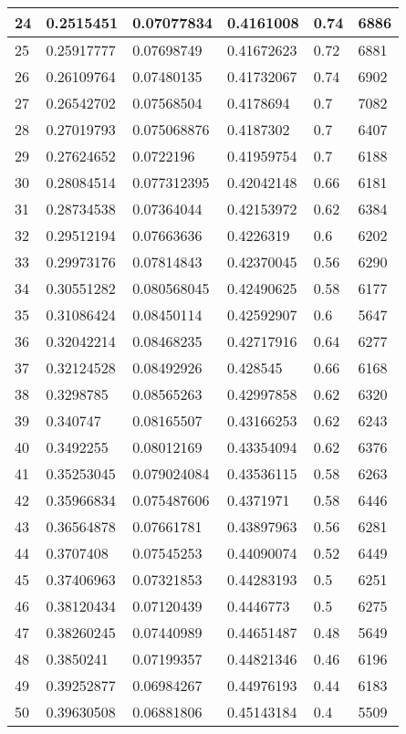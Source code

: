 \begin{longtable}{|l|l|l|l|l|l|}
24 & 0.2515451 & 0.07077834 & 0.4161008 & 0.74 & 6886 \\ \hline 
25 & 0.25917777 & 0.07698749 & 0.41672623 & 0.72 & 6881 \\ \hline 
26 & 0.26109764 & 0.07480135 & 0.41732067 & 0.74 & 6902 \\ \hline 
27 & 0.26542702 & 0.07568504 & 0.4178694 & 0.7 & 7082 \\ \hline 
28 & 0.27019793 & 0.075068876 & 0.4187302 & 0.7 & 6407 \\ \hline 
29 & 0.27624652 & 0.0722196 & 0.41959754 & 0.7 & 6188 \\ \hline 
30 & 0.28084514 & 0.077312395 & 0.42042148 & 0.66 & 6181 \\ \hline 
31 & 0.28734538 & 0.07364044 & 0.42153972 & 0.62 & 6384 \\ \hline 
32 & 0.29512194 & 0.07663636 & 0.4226319 & 0.6 & 6202 \\ \hline 
33 & 0.29973176 & 0.07814843 & 0.42370045 & 0.56 & 6290 \\ \hline 
34 & 0.30551282 & 0.080568045 & 0.42490625 & 0.58 & 6177 \\ \hline 
35 & 0.31086424 & 0.08450114 & 0.42592907 & 0.6 & 5647 \\ \hline 
36 & 0.32042214 & 0.08468235 & 0.42717916 & 0.64 & 6277 \\ \hline 
37 & 0.32124528 & 0.08492926 & 0.428545 & 0.66 & 6168 \\ \hline 
38 & 0.3298785 & 0.08565263 & 0.42997858 & 0.62 & 6320 \\ \hline 
39 & 0.340747 & 0.08165507 & 0.43166253 & 0.62 & 6243 \\ \hline 
40 & 0.3492255 & 0.08012169 & 0.43354094 & 0.62 & 6376 \\ \hline 
41 & 0.35253045 & 0.079024084 & 0.43536115 & 0.58 & 6263 \\ \hline 
42 & 0.35966834 & 0.075487606 & 0.4371971 & 0.58 & 6446 \\ \hline 
43 & 0.36564878 & 0.07661781 & 0.43897963 & 0.56 & 6281 \\ \hline 
44 & 0.3707408 & 0.07545253 & 0.44090074 & 0.52 & 6449 \\ \hline 
45 & 0.37406963 & 0.07321853 & 0.44283193 & 0.5 & 6251 \\ \hline 
46 & 0.38120434 & 0.07120439 & 0.4446773 & 0.5 & 6275 \\ \hline 
47 & 0.38260245 & 0.07440989 & 0.44651487 & 0.48 & 5649 \\ \hline 
48 & 0.3850241 & 0.07199357 & 0.44821346 & 0.46 & 6196 \\ \hline 
49 & 0.39252877 & 0.06984267 & 0.44976193 & 0.44 & 6183 \\ \hline 
50 & 0.39630508 & 0.06881806 & 0.45143184 & 0.4 & 5509 \\ \hline 
\end{longtable}